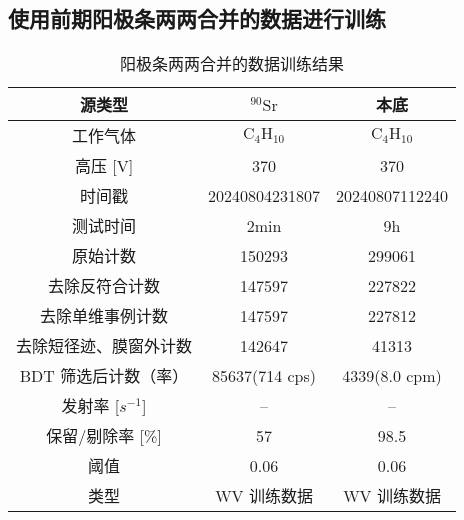 \subsection{使用前期阳极条两两合并的数据进行训练}
\begin{table}[!htbp]
    \centering
    \caption{阳极条两两合并的数据训练结果}
    \label{tab:big}
    \begin{tabular}{c c c}
    \toprule
    源类型                  &   $\mathrm{^{90}Sr}$      &   本底    \\
    \midrule
    工作气体                &   $\mathrm{C_4H_{10}}$    &   $\mathrm{C_4H_{10}}$    \\
    高压 [V]                &    370                    &   370 \\
    时间戳                  &   20240804231807          &   20240807112240  \\
    测试时间                &   2min                    &   9h  \\
    原始计数                &   150293                  &   299061  \\
    去除反符合计数          &   147597                  &   227822  \\
    去除单维事例计数        &   147597                  &   227812  \\
    去除短径迹、膜窗外计数  &   142647                  &   41313   \\
    BDT 筛选后计数（率）    &   85637(714 cps)          &   4339(8.0 cpm)\\
    发射率 [$s^{-1}$]       &   --                      &   --  \\
    保留/剔除率 [\%]               &   57                      &   98.5  \\
    阈值                    &   0.06                    &   0.06    \\
    类型                    &   WV 训练数据             &   WV 训练数据 \\
    \bottomrule
    \end{tabular}
\end{table}

